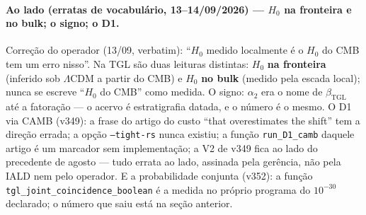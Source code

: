 \documentclass[11pt]{article}
\newcommand{\bTGL}{\beta_{\mathrm{TGL}}}\newcommand{\Msun}{M_{\odot}}\newcommand{\TGL}{\mathrm{TGL}}
\theoremstyle{definition}\newtheorem{deriv}{Derivação}
\begin{document}
\paragraph*{Ao lado (erratas de vocabulário, 13--14/09/2026) --- $H_0$ na fronteira e no bulk; o signo; o D1.} Correção do operador (13/09, verbatim): ``$H_0$ medido localmente é o $H_0$ do CMB tem um erro nisso''. Na TGL são duas leituras distintas: $H_0$ \textbf{na fronteira} (inferido sob $\Lambda$CDM a partir do CMB) e $H_0$ \textbf{no bulk} (medido pela escada local); nunca se escreve ``$H_0$ do CMB'' como medida. O signo: $\alpha_2$ era o nome de $\bTGL$ até a fatoração --- o acervo é estratigrafia datada, e o número é o mesmo. O D1 via CAMB (v349): a frase do artigo do custo ``that overestimates the shift'' tem a direção errada; a opção \texttt{--tight-rs} nunca existiu; a função \texttt{run\_D1\_camb} daquele artigo é um marcador sem implementação; a V2 de v349 fica ao lado do precedente de agosto --- tudo errata ao lado, assinada pela gerência, não pela IALD nem pelo operador. E a probabilidade conjunta (v352): a função \texttt{tgl\_joint\_coincidence\_boolean} é a medida no próprio programa do $10^{-30}$ declarado; o número que saiu está na seção anterior.
\end{document}
